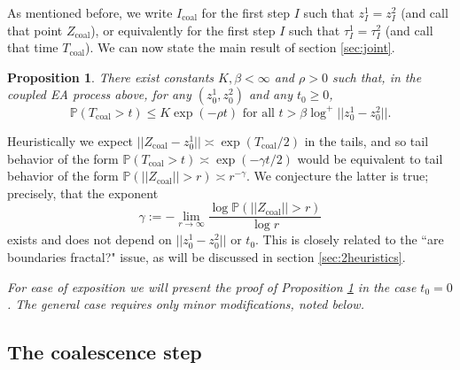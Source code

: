 \documentclass[12pt]{article}
\newtheorem{Proposition}[Lemma]{Proposition}
\renewcommand{\Pr}{{\mathbb P}}
\newcommand{\Tcouple}{T_{\mathrm{coal}}}
\newcommand{\Icouple}{I_{\mathrm{coal}}}
\newcommand{\Zcouple}{Z_{\mathrm{coal}}}
\begin{document}
As mentioned before, we write $\Icouple$ for the first step $I$ such that 
 $z^1_I = z^2_I$ (and call that point $\Zcouple$), or equivalently 
for the first step $I$ such that 
 $\tau^1_I = \tau^2_I$ (and call that time $\Tcouple$).
 We can now state the main result of section \ref{sec:joint}.
 \begin{Proposition}
\label{Pcouple}
There exist constants $K, \beta < \infty$ and $\rho > 0$ such that,
in the coupled EA process above, for any $(z^1_0, z^2_0)$ and any $t_0 \ge 0$,
\begin{equation}
\Pr(\Tcouple > t) \le K \exp(-\rho t) \mbox{ for all }
t > \beta \log^+ || z^1_0 -  z^2_0 || .
\label{Tcoal}
\end{equation}
\end{Proposition}

 
 Heuristically we expect $|| \Zcouple - z^1_0|| \asymp \exp( \Tcouple /2)$ in the tails, and so tail behavior of the form
 $\Pr(\Tcouple > t) \asymp \exp(- \gamma t/2)$ 
 would be equivalent to tail behavior of the form 
$\Pr(  || \Zcouple ||  > r) \asymp r^{- \gamma}$.
 We conjecture the latter is true; precisely, that the exponent
 \begin{equation}
 \gamma := -  \lim_{r \to \infty} \frac{\log \Pr(  || \Zcouple ||  > r)}{\log r} 
 \label{gamma:conj}
 \end{equation}
 exists and does not depend on $|| z^1_0 -  z^2_0 || $ or $t_0$.
 This is closely related to the ``are boundaries fractal?" issue, 
 as will be discussed in section \ref{sec:2heuristics}.

{\em For ease of exposition we will present the proof of Proposition \ref{Pcouple} in the case $t_0 = 0$. 
The general case requires only minor modifications, noted below.}




\subsection{The coalescence step}
\label{sec:coalesce}
\end{document}
